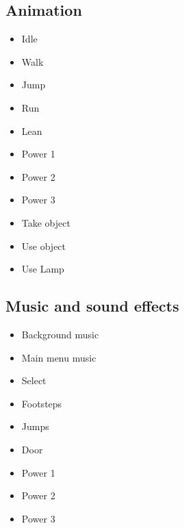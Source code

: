 \subsection{Animation}
\begin{itemize}  
\item Idle
\item Walk
\item Jump
\item Run
\item Lean
\item Power 1
\item Power 2
\item Power 3
\item Take object
\item Use object
\item Use Lamp
\end{itemize}

\subsection{Music and sound effects}
\begin{itemize}  
\item Background music
\item Main menu music
\item Select 
\item Footsteps
\item Jumps
\item Door
\item Power 1
\item Power 2
\item Power 3
\end{itemize}
